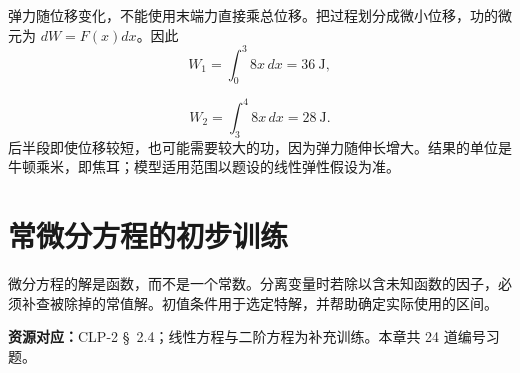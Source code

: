 \documentclass[12pt,fontset=fandol]{ctexart}
\begin{document}
\begin{solve}\label{ans:c21q24}
弹力随位移变化，不能使用末端力直接乘总位移。把过程划分成微小位移，功的微元为 $dW=F(x)dx$。因此
\[
W_1=\int_0^{3}8x\,dx=36\ \mathrm{J},
\]

\[
W_2=\int_{3}^{4}8x\,dx=28\ \mathrm{J}.
\]
后半段即使位移较短，也可能需要较大的功，因为弹力随伸长增大。结果的单位是牛顿乘米，即焦耳；模型适用范围以题设的线性弹性假设为准。
\end{solve}

\clearpage
\section{常微分方程的初步训练}\label{sec:ch22}
微分方程的解是函数，而不是一个常数。分离变量时若除以含未知函数的因子，必须补查被除掉的常值解。初值条件用于选定特解，并帮助确定实际使用的区间。

\textbf{资源对应：}CLP-2 \S~2.4；线性方程与二阶方程为补充训练。本章共 24 道编号习题。
\end{document}
